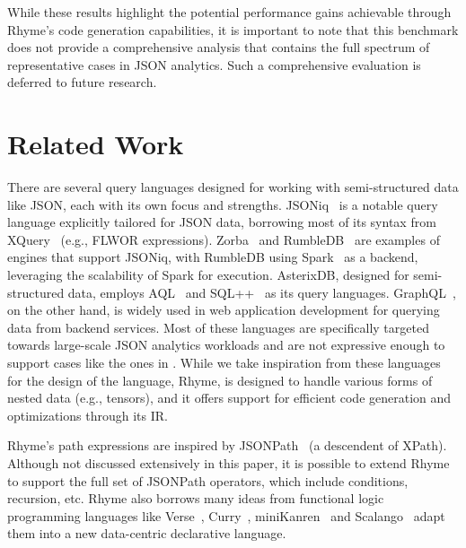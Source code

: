 \documentclass[runningheads]{llncs}
\newcommand{\lang}{Rhyme}
\begin{document}
While these results highlight the potential performance gains achievable
through \lang{}'s code generation capabilities, it is important to note
that this benchmark does not provide a comprehensive analysis that contains the
full spectrum of representative cases in JSON analytics.
Such a comprehensive evaluation is deferred to future research.

\section{Related Work}\label{sec:related_work}
There are several query languages designed for working with semi-structured data like
JSON, each with its own focus and strengths.
JSONiq~\cite{jsoniq,jsoniq_paper} is a notable query language explicitly tailored for
JSON data, borrowing most of its syntax from XQuery~\cite{xquery} (e.g., FLWOR expressions).
Zorba~\cite{zobra} and RumbleDB~\cite{rumble_vldb} are examples of engines that support
JSONiq, with RumbleDB using Spark~\cite{spark} as a backend, leveraging the scalability
of Spark for execution.
AsterixDB, designed for semi-structured data, employs AQL~\cite{aql} and SQL++~\cite{sqlpp}
as its query languages.
GraphQL~\cite{graphql}, on the other hand, is widely used in web application development
for querying data from backend services.
Most of these languages are specifically targeted towards large-scale JSON analytics workloads
and are not expressive enough to support cases like the ones
in .
While we take inspiration from these languages for the design of the language,
\lang{}, is designed to handle various forms of nested data (e.g., tensors),
and it offers support for efficient code generation and optimizations
through its IR.

\lang{}'s path expressions are inspired by JSONPath~\cite{jsonpath} (a descendent of XPath).
Although not discussed extensively in this paper, it is possible to extend \lang{} to support
the full set of JSONPath operators, which include conditions, recursion, etc.
\lang{} also borrows many ideas from functional logic programming languages like
Verse~\cite{verse}, Curry~\cite{curry}, miniKanren~\cite{miniKanren_thesis} and 
Scalango~\cite{scalango} adapt them into a new data-centric declarative language.
\end{document}
